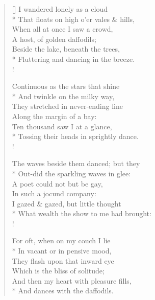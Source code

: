 \documentclass[MAIN]{subfiles}
\begin{document}
\settowidth{\versewidth}{I wandered lonely as a cloud}
\begin{verse}[\versewidth]
I wandered lonely as a cloud\\* 
\vin That floats on high o'er vales \& hills,\\
When all at once I saw a crowd,\\
\vin A host, of golden daffodils;\\
Beside the lake, beneath the trees,\\*
Fluttering and dancing in the breeze.\\!

Continuous as the stars that shine\\*
\vin And twinkle on the milky way,\\
They stretched in never-ending line\\
\vin Along the margin of a bay:\\
Ten thousand saw I at a glance,\\*
Tossing their heads in sprightly dance.\\!

The waves beside them danced; but they\\*
\vin Out-did the sparkling waves in glee:\\
A poet could not but be gay,\\
\vin In such a jocund company:\\
I gazed \& gazed, but little thought\\*
What wealth the show to me had brought:\\!

For oft, when on my couch I lie\\*
\vin In vacant or in pensive mood,\\
They flash upon that inward eye\\
\vin Which is the bliss of solitude;\\
And then my heart with pleasure fills,\\*
And dances with the daffodils.
\end{verse}
\end{document}
